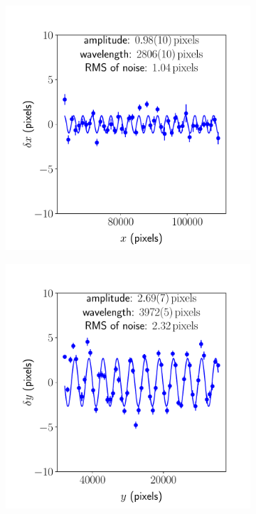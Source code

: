 \documentclass{article}
\begin{document}
\begin{figure}[ht]
\begin{subfigure}{0.24\linewidth}
	       \caption{}
	       \label{fig:sinewaveyy1}
	\end{subfigure}
	\begin{subfigure}{0.24\linewidth}
	       \includegraphics[width=\linewidth]{sine-wave-xx-2.pdf}
	       \caption{}
	       \label{fig:sinewavexx2}
	\end{subfigure}
	\begin{subfigure}{0.24\linewidth}
	       \includegraphics[width=\linewidth]{sine-wave-yy-2.pdf}

\end{subfigure}
\end{figure}
\end{document}
